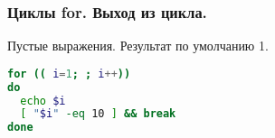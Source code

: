 \begin{frame}[fragile]
\frametitle{ Циклы for. Выход из цикла.}
  \begin{block}{Пустые выражения. Результат по умолчанию 1. }
    \begin{lstlisting}[language=sh,frame=single]
for (( i=1; ; i++))
do
  echo $i 
  [ "$i" -eq 10 ] && break 
done
\end{lstlisting}
  \end{block}
\end{frame}

